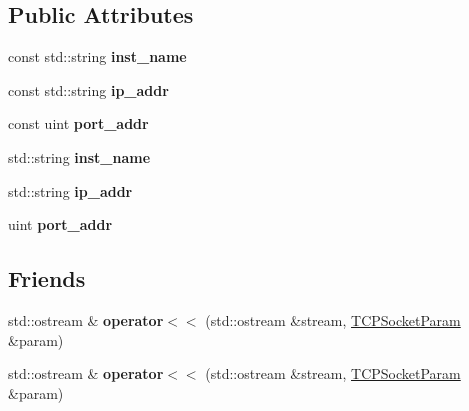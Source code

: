 \subsection*{Public Attributes}
\begin{DoxyCompactItemize}
\item 
\hypertarget{struct_t_c_p_socket_param_adbcd0c094d7e3a8f8b083689ddccaff0}{const std\+::string {\bfseries inst\+\_\+name}}\label{struct_t_c_p_socket_param_adbcd0c094d7e3a8f8b083689ddccaff0}

\item 
\hypertarget{struct_t_c_p_socket_param_a4dc4a074c147c36e0b281f7c25a96185}{const std\+::string {\bfseries ip\+\_\+addr}}\label{struct_t_c_p_socket_param_a4dc4a074c147c36e0b281f7c25a96185}

\item 
\hypertarget{struct_t_c_p_socket_param_a25103ad0fba22c679759538a8e2061b9}{const uint {\bfseries port\+\_\+addr}}\label{struct_t_c_p_socket_param_a25103ad0fba22c679759538a8e2061b9}

\item 
\hypertarget{struct_t_c_p_socket_param_ac6dd6cff76fe32d52214c39c8541201e}{std\+::string {\bfseries inst\+\_\+name}}\label{struct_t_c_p_socket_param_ac6dd6cff76fe32d52214c39c8541201e}

\item 
\hypertarget{struct_t_c_p_socket_param_a4f424a058098e28b8a51c5d17b1fdc8a}{std\+::string {\bfseries ip\+\_\+addr}}\label{struct_t_c_p_socket_param_a4f424a058098e28b8a51c5d17b1fdc8a}

\item 
\hypertarget{struct_t_c_p_socket_param_a32da96a5f7f1aa3fe92db4454fba947c}{uint {\bfseries port\+\_\+addr}}\label{struct_t_c_p_socket_param_a32da96a5f7f1aa3fe92db4454fba947c}

\end{DoxyCompactItemize}
\subsection*{Friends}
\begin{DoxyCompactItemize}
\item 
\hypertarget{struct_t_c_p_socket_param_a2d9b78bcfdce6bdc7e301d7e819114c7}{std\+::ostream \& {\bfseries operator$<$$<$} (std\+::ostream \&stream, \hyperlink{struct_t_c_p_socket_param}{T\+C\+P\+Socket\+Param} \&param)}\label{struct_t_c_p_socket_param_a2d9b78bcfdce6bdc7e301d7e819114c7}

\item 
\hypertarget{struct_t_c_p_socket_param_a2d9b78bcfdce6bdc7e301d7e819114c7}{std\+::ostream \& {\bfseries operator$<$$<$} (std\+::ostream \&stream, \hyperlink{struct_t_c_p_socket_param}{T\+C\+P\+Socket\+Param} \&param)}\label{struct_t_c_p_socket_param_a2d9b78bcfdce6bdc7e301d7e819114c7}

\end{DoxyCompactItemize}


